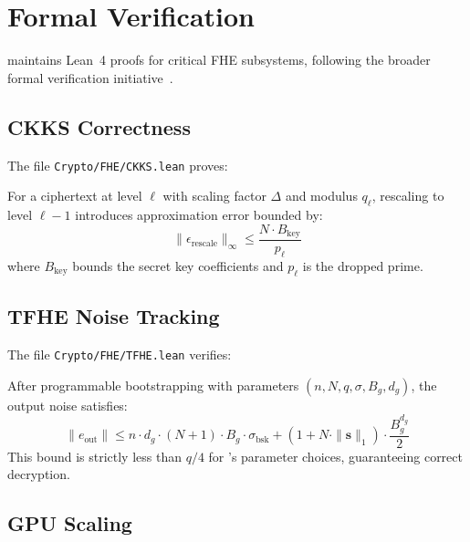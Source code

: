\section{Formal Verification}

\label{sec:formal}

\Zoo{} maintains Lean~4 proofs for critical FHE subsystems, following the broader \Zoo{} formal verification initiative~\cite{zoo-network-architecture}.

\subsection{CKKS Correctness}

The file \texttt{Crypto/FHE/CKKS.lean} proves:

\begin{theorem}
For a \CKKS{} ciphertext at level $\ell$ with scaling factor $\Delta$ and modulus $q_\ell$, rescaling to level $\ell - 1$ introduces approximation error bounded by:
\begin{equation}
  \|\epsilon_{\mathrm{rescale}}\|_\infty \leq \frac{N \cdot B_{\mathrm{key}}}{p_\ell}
\end{equation}
where $B_{\mathrm{key}}$ bounds the secret key coefficients and $p_\ell$ is the dropped prime.
\end{theorem}

\subsection{TFHE Noise Tracking}

The file \texttt{Crypto/FHE/TFHE.lean} verifies:

\begin{theorem}
After programmable bootstrapping with parameters $(n, N, q, \sigma, B_g, d_g)$, the output noise satisfies:
\begin{equation}
  \|e_{\mathrm{out}}\| \leq n \cdot d_g \cdot (N+1) \cdot B_g \cdot \sigma_{\mathrm{bsk}} + (1 + N \cdot \|\mathbf{s}\|_1) \cdot \frac{B_g^{d_g}}{2}
\end{equation}
This bound is strictly less than $q/4$ for \Zoo{}'s parameter choices, guaranteeing correct decryption.
\end{theorem}

\subsection{GPU Scaling}

